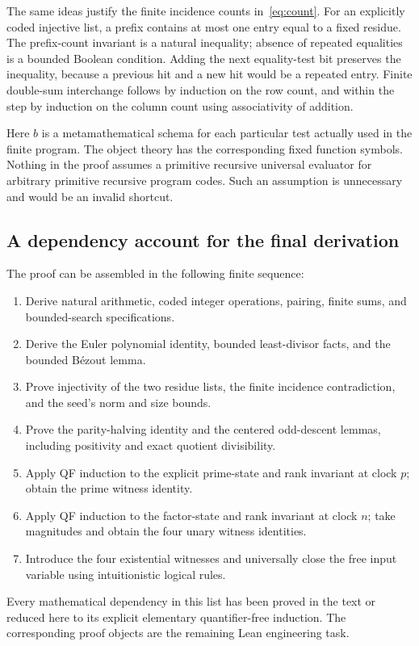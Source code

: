 The same ideas justify the finite incidence counts in~\eqref{eq:count}.
For an explicitly coded injective list, a prefix contains at most one
entry equal to a fixed residue. The prefix-count invariant is a natural
inequality; absence of repeated equalities is a bounded Boolean condition.
Adding the next equality-test bit preserves the inequality, because a
previous hit and a new hit would be a repeated entry. Finite double-sum
interchange follows by induction on the row count, and within the step
by induction on the column count using associativity of addition.

Here $b$ is a metamathematical schema for each particular test actually
used in the finite program. The object theory has the corresponding
fixed function symbols. Nothing in the proof assumes a primitive
recursive universal evaluator for arbitrary primitive recursive program
codes. Such an assumption is unnecessary and would be an invalid shortcut.

\subsection{A dependency account for the final derivation}

The proof can be assembled in the following finite sequence:
\begin{enumerate}
\item Derive natural arithmetic, coded integer operations, pairing,
finite sums, and bounded-search specifications.
\item Derive the Euler polynomial identity, bounded least-divisor facts,
and the bounded B\'ezout lemma.
\item Prove injectivity of the two residue lists, the finite incidence
contradiction, and the seed's norm and size bounds.
\item Prove the parity-halving identity and the centered odd-descent lemmas,
including positivity and exact quotient divisibility.
\item Apply QF induction to the explicit prime-state and rank invariant
at clock $p$; obtain the prime witness identity.
\item Apply QF induction to the factor-state and rank invariant at clock
$n$; take magnitudes and obtain the four unary witness identities.
\item Introduce the four existential witnesses and universally close the
free input variable using intuitionistic logical rules.
\end{enumerate}

Every mathematical dependency in this list has been proved in the text
or reduced here to its explicit elementary quantifier-free induction.
The corresponding proof objects are the remaining Lean engineering task.
